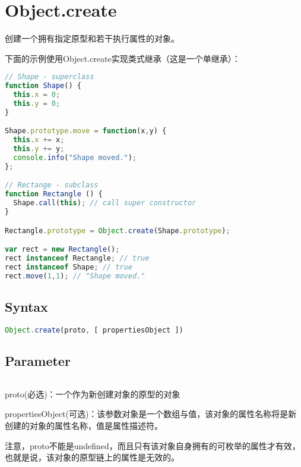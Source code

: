 \section{Object.create}

创建一个拥有指定原型和若干执行属性的对象。

下面的示例使用Object.create实现类式继承（这是一个单继承）：

\begin{lstlisting}[language=JavaScript]
// Shape - superclass
function Shape() {
  this.x = 0;
  this.y = 0;
}

Shape.prototype.move = function(x,y) {
  this.x += x;
  this.y += y;
  console.info("Shape moved.");
};

// Rectange - subclass
function Rectangle () {
  Shape.call(this); // call super constructor
}

Rectangle.prototype = Object.create(Shape.prototype);

var rect = new Rectangle();
rect instanceof Rectangle; // true
rect instanceof Shape; // true
rect.move(1,1); // "Shape moved."

\end{lstlisting}


\subsection{Syntax}


\begin{lstlisting}[language=JavaScript]
Object.create(proto, [ propertiesObject ])
\end{lstlisting}


\subsection{Parameter}


\begin{lstlisting}[language=JavaScript]

\end{lstlisting}


\begin{compactitem}
\item proto(必选)：一个作为新创建对象的原型的对象
\item propertiesObject(可选)：该参数对象是一个数组与值，该对象的属性名称将是新创建的对象的属性名称，值是属性描述符。
\end{compactitem}

注意，proto不能是undefined，而且只有该对象自身拥有的可枚举的属性才有效，也就是说，该对象的原型链上的属性是无效的。


